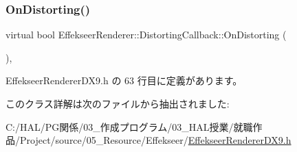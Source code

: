 \subsubsection{\texorpdfstring{On\+Distorting()}{OnDistorting()}}
{\footnotesize\ttfamily virtual bool Effekseer\+Renderer\+::\+Distorting\+Callback\+::\+On\+Distorting (\begin{DoxyParamCaption}{ }\end{DoxyParamCaption})\hspace{0.3cm}{\ttfamily [inline]}, {\ttfamily [virtual]}}



 Effekseer\+Renderer\+D\+X9.\+h の 63 行目に定義があります。



このクラス詳解は次のファイルから抽出されました\+:\begin{DoxyCompactItemize}
\item 
C\+:/\+H\+A\+L/\+P\+G関係/03\+\_\+作成プログラム/03\+\_\+\+H\+A\+L授業/就職作品/\+Project/source/05\+\_\+\+Resource/\+Effekseer/\mbox{\hyperlink{_effekseer_renderer_d_x9_8h}{Effekseer\+Renderer\+D\+X9.\+h}}\end{DoxyCompactItemize}
